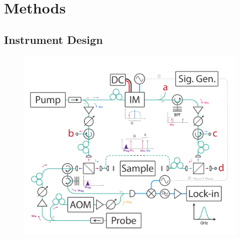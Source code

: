 \section{Methods}\label{Methods}
\subsection{Instrument Design}
\label{Methods:Instrument Design}

\begin{figure}[htbp]
\centering
\vspace{-22mm}
\includegraphics[width=\textwidth]{figs/3-CoBS/Instrument Design Final.pdf}
\caption[Design schematic of the Coherently stimulated Brillouin Scattering (\acs{CoBS}) spectrometer.]{
}
\end{figure}
